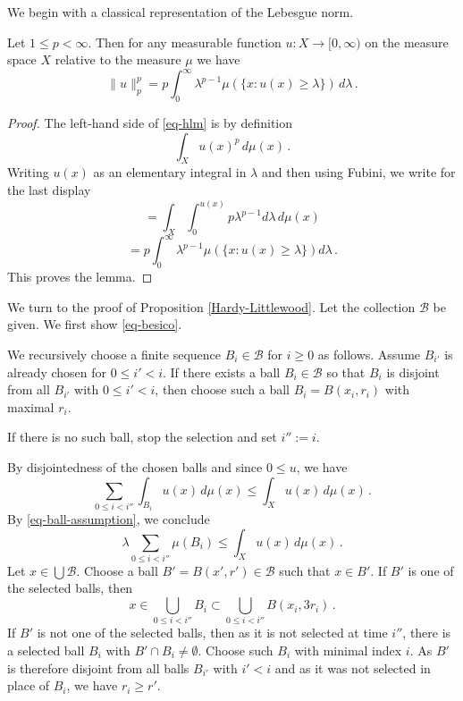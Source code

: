 {We begin with a classical representation of the Lebesgue norm.
\begin{lemma}\label{layer-cake-representation}
Let $1\le p< \infty$.  Then for any measurable function $u:X\to [0,\infty)$ on the measure space $X$
relative to the measure $\mu$
we have
\begin{equation}\label{eq-layercake}
    \|u\|_p^p=p\int_0^\infty \lambda^{p-1}\mu(\{x: u(x)\ge \lambda\})\, d\lambda\, .
\end{equation}
\end{lemma}
\begin{proof}
    The left-hand side of \eqref{eq-hlm} is by definition
\begin{equation}
    \int_X u(x)^p \, d\mu(x)\, .\end{equation}
    Writing $u(x)$ as an elementary integral in $\lambda$ and then using Fubini, we write for the last display
    \begin{equation}
    =\int_X \int _0^{u(x)}
    p \lambda^{p-1} d\lambda\, d\mu(x)
\end{equation}
\begin{equation}
 =p\int _0^{\infty}
    \lambda^{p-1} \mu(\{x: u(x)\ge \lambda\}) d\lambda\, .
\end{equation}
This proves the lemma.
\end{proof}

We turn to the proof of Proposition \ref{Hardy-Littlewood}.
Let the collection $\mathcal{B}$ be given.
We first show \eqref{eq-besico}.



We recursively choose a finite sequence $B_i\in \mathcal{B}$
for $i\ge 0$ as follows. Assume $B_{i'}$
is already chosen for $0\le i'<i$.
If there exists a ball $B_{i}\in \mathcal{B}$ so that $B_{i}$
is disjoint from all $B_{i'}$
with $0\le i'<i$, then choose
such a ball $B_i=B(x_i,r_i)$ with maximal $r_i$.

If there is no such ball, stop the selection and set
$i'':=i$.

By  disjointedness of the chosen balls and since $0 \le u$, we have
\begin{equation}
\sum_{0\le i<i''}\int_{B_i} u(x)\, d\mu(x) \le \int_X  u(x)\, d\mu(x)\, .
\end{equation}
By \eqref{eq-ball-assumption}, we conclude
\begin{equation}\label{eqbes1}
\lambda \sum_{0\le i<i''}\mu(B_i)
\le  \int_X  u(x)\, d\mu(x)\, .
\end{equation}
Let $x\in \bigcup \mathcal{B}$.
Choose a ball $B'=B(x',r')\in \mathcal{B}$
such that $x\in B'$.
If $B'$ is one of the selected balls, then
\begin{equation}\label{3rone}
    x\in \bigcup _{0\le i< i''}B_i\subset \bigcup _{0\le i< i''}B(x_i,3r_i)\, .
\end{equation}
If $B'$ is not one of the selected balls, then as it is not selected at time $i''$, there is a selected ball $B_i$  with
$B'\cap B_i\neq \emptyset$.
Choose such $B_i$ with minimal index $i$. As $B'$ is therefore disjoint from all
balls $B_{i'}$ with $i'<i$ and
as it was not selected in place of $B_i$, we have $r_i\ge r'$.

}
